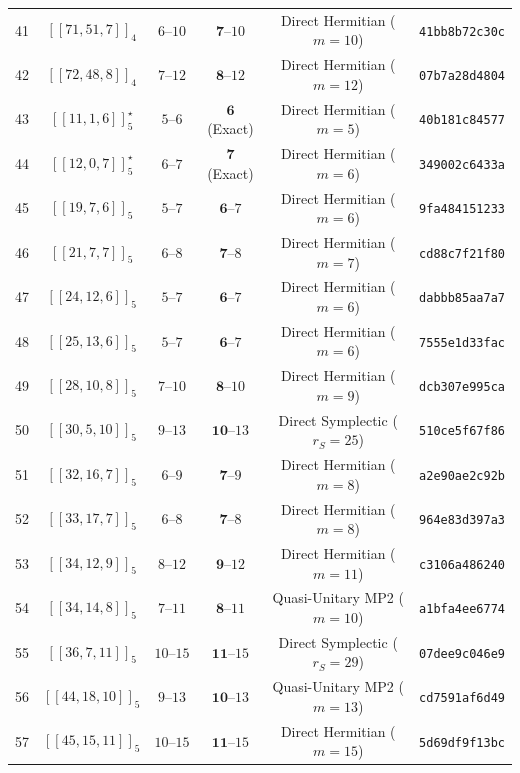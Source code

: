 \documentclass[11pt,a4paper]{article}
\theoremstyle{remark}
\begin{document}
{\begin{longtable}{@{}rccccl@{}}
41 & $[[71,51,7]]_{4}$ & $6\text{--}10$ & $\mathbf{7}\text{--}10$ & Direct Hermitian ($m=10$) & \texttt{41bb8b72c30c} \\
42 & $[[72,48,8]]_{4}$ & $7\text{--}12$ & $\mathbf{8}\text{--}12$ & Direct Hermitian ($m=12$) & \texttt{07b7a28d4804} \\
\midrule
43 & $[[11,1,6]]_{5}^\star$ & $5\text{--}6$ & $\mathbf{6}$ (Exact) & Direct Hermitian ($m=5$) & \texttt{40b181c84577} \\
44 & $[[12,0,7]]_{5}^\star$ & $6\text{--}7$ & $\mathbf{7}$ (Exact) & Direct Hermitian ($m=6$) & \texttt{349002c6433a} \\
45 & $[[19,7,6]]_{5}$ & $5\text{--}7$ & $\mathbf{6}\text{--}7$ & Direct Hermitian ($m=6$) & \texttt{9fa484151233} \\
46 & $[[21,7,7]]_{5}$ & $6\text{--}8$ & $\mathbf{7}\text{--}8$ & Direct Hermitian ($m=7$) & \texttt{cd88c7f21f80} \\
47 & $[[24,12,6]]_{5}$ & $5\text{--}7$ & $\mathbf{6}\text{--}7$ & Direct Hermitian ($m=6$) & \texttt{dabbb85aa7a7} \\
48 & $[[25,13,6]]_{5}$ & $5\text{--}7$ & $\mathbf{6}\text{--}7$ & Direct Hermitian ($m=6$) & \texttt{7555e1d33fac} \\
49 & $[[28,10,8]]_{5}$ & $7\text{--}10$ & $\mathbf{8}\text{--}10$ & Direct Hermitian ($m=9$) & \texttt{dcb307e995ca} \\
50 & $[[30,5,10]]_{5}$ & $9\text{--}13$ & $\mathbf{10}\text{--}13$ & Direct Symplectic ($r_S=25$) & \texttt{510ce5f67f86} \\
51 & $[[32,16,7]]_{5}$ & $6\text{--}9$ & $\mathbf{7}\text{--}9$ & Direct Hermitian ($m=8$) & \texttt{a2e90ae2c92b} \\
52 & $[[33,17,7]]_{5}$ & $6\text{--}8$ & $\mathbf{7}\text{--}8$ & Direct Hermitian ($m=8$) & \texttt{964e83d397a3} \\
53 & $[[34,12,9]]_{5}$ & $8\text{--}12$ & $\mathbf{9}\text{--}12$ & Direct Hermitian ($m=11$) & \texttt{c3106a486240} \\
54 & $[[34,14,8]]_{5}$ & $7\text{--}11$ & $\mathbf{8}\text{--}11$ & Quasi-Unitary MP2 ($m=10$) & \texttt{a1bfa4ee6774} \\
55 & $[[36,7,11]]_{5}$ & $10\text{--}15$ & $\mathbf{11}\text{--}15$ & Direct Symplectic ($r_S=29$) & \texttt{07dee9c046e9} \\
56 & $[[44,18,10]]_{5}$ & $9\text{--}13$ & $\mathbf{10}\text{--}13$ & Quasi-Unitary MP2 ($m=13$) & \texttt{cd7591af6d49} \\
57 & $[[45,15,11]]_{5}$ & $10\text{--}15$ & $\mathbf{11}\text{--}15$ & Direct Hermitian ($m=15$) & \texttt{5d69df9f13bc} \\

\end{longtable}}
\end{document}
